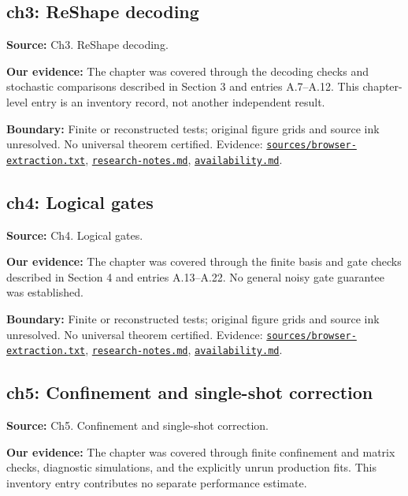 \documentclass[11pt]{article}
\begin{document}
\subsection{ch3: ReShape decoding}
\label{claim:ch3}
\textbf{Source:} Ch3. ReShape decoding.

\textbf{Our evidence:} The chapter was covered through the decoding checks and stochastic comparisons described in Section 3 and entries A.7--A.12. This chapter-level entry is an inventory record, not another independent result.

\textbf{Boundary:} Finite or reconstructed tests; original figure grids and source ink unresolved. No universal theorem certified. Evidence: \href{https://github.com/alectionary/vibe-math/blob/master/formalization/quintavalle-hgp/sources/browser-extraction.txt}{\nolinkurl{sources/browser-extraction.txt}}, \href{https://github.com/alectionary/vibe-math/blob/master/formalization/quintavalle-hgp/research-notes.md}{\nolinkurl{research-notes.md}}, \href{https://github.com/alectionary/vibe-math/blob/master/formalization/quintavalle-hgp/availability.md}{\nolinkurl{availability.md}}.
\subsection{ch4: Logical gates}
\label{claim:ch4}
\textbf{Source:} Ch4. Logical gates.

\textbf{Our evidence:} The chapter was covered through the finite basis and gate checks described in Section 4 and entries A.13--A.22. No general noisy gate guarantee was established.

\textbf{Boundary:} Finite or reconstructed tests; original figure grids and source ink unresolved. No universal theorem certified. Evidence: \href{https://github.com/alectionary/vibe-math/blob/master/formalization/quintavalle-hgp/sources/browser-extraction.txt}{\nolinkurl{sources/browser-extraction.txt}}, \href{https://github.com/alectionary/vibe-math/blob/master/formalization/quintavalle-hgp/research-notes.md}{\nolinkurl{research-notes.md}}, \href{https://github.com/alectionary/vibe-math/blob/master/formalization/quintavalle-hgp/availability.md}{\nolinkurl{availability.md}}.
\subsection{ch5: Confinement and single-shot correction}
\label{claim:ch5}
\textbf{Source:} Ch5. Confinement and single-shot correction.

\textbf{Our evidence:} The chapter was covered through finite confinement and matrix checks, diagnostic simulations, and the explicitly unrun production fits. This inventory entry contributes no separate performance estimate.
\end{document}
